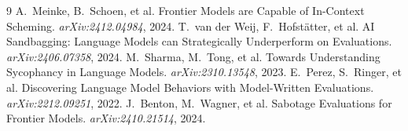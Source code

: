 \documentclass[10pt,twocolumn]{article}
\begin{document}
{\small
\begin{thebibliography}{9}
 A.~Meinke, B.~Schoen, et al. Frontier Models are Capable of
In-Context Scheming. \emph{arXiv:2412.04984}, 2024.
 T.~van der Weij, F.~Hofst\"atter, et al. AI Sandbagging:
Language Models can Strategically Underperform on Evaluations. \emph{arXiv:2406.07358}, 2024.
 M.~Sharma, M.~Tong, et al. Towards Understanding Sycophancy in
Language Models. \emph{arXiv:2310.13548}, 2023.
 E.~Perez, S.~Ringer, et al. Discovering Language Model
Behaviors with Model-Written Evaluations. \emph{arXiv:2212.09251}, 2022.
 J.~Benton, M.~Wagner, et al. Sabotage Evaluations for Frontier
Models. \emph{arXiv:2410.21514}, 2024.
\end{thebibliography}
}
\end{document}
